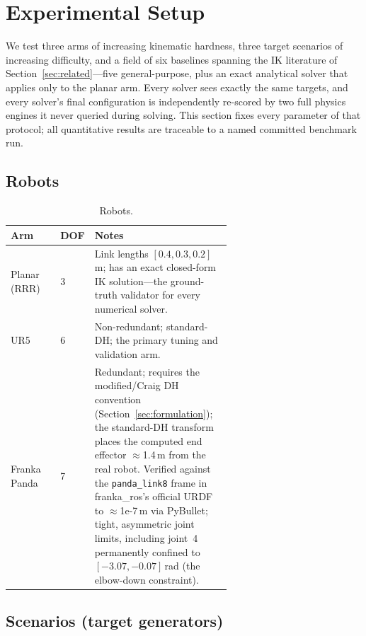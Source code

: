 \documentclass[10pt,conference]{IEEEtran}
\begin{document}
\section{Experimental Setup}
\label{sec:setup}

We test three arms of increasing kinematic hardness, three target scenarios of
increasing difficulty, and a field of six baselines spanning the IK literature of
Section~\ref{sec:related}---five general-purpose, plus an exact analytical solver
that applies only to the planar arm. Every solver sees exactly the same targets,
and every solver's final configuration is independently re-scored by two full
physics engines it never queried during solving. This section fixes every
parameter of that protocol; all quantitative results are traceable to a named
committed benchmark run.

\subsection{Robots}
\label{sec:robots}

\begin{table}[t]
\centering
\caption{Robots.}
\label{tab:robots}
\footnotesize
\setlength{\tabcolsep}{4pt}
\begin{tabular}{@{}ll>{\raggedright\arraybackslash}p{0.62\linewidth}@{}}
\toprule
Arm & DOF & Notes \\
\midrule
Planar (RRR) & 3 &
Link lengths $[0.4, 0.3, 0.2]$\,m; has an exact closed-form IK solution---the
ground-truth validator for every numerical solver. \\
UR5 & 6 &
Non-redundant; standard-DH; the primary tuning and validation arm. \\
Franka Panda & 7 &
Redundant; requires the modified/Craig DH convention
(Section~\ref{sec:formulation}); the standard-DH transform places the computed
end effector $\approx$1.4\,m from the real robot. Verified against the
\texttt{panda\_link8} frame in franka\_ros's official URDF~\cite{b43} to
$\approx$1e-7\,m via PyBullet; tight, asymmetric joint limits, including joint~4
permanently confined to $[-3.07, -0.07]$\,rad (the elbow-down constraint). \\
\bottomrule
\end{tabular}
\end{table}

\subsection{Scenarios (target generators)}
\label{sec:scenarios}
\end{document}
